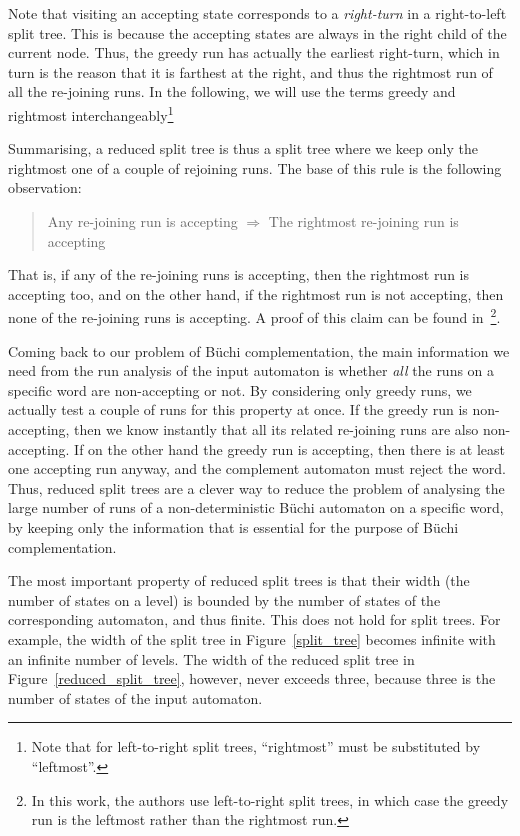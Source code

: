 Note that visiting an accepting state corresponds to a \textit{right-turn} in a right-to-left split tree. This is because the accepting states are always in the right child of the current node. Thus, the greedy run has actually the earliest right-turn, which in turn is the reason that it is farthest at the right, and thus the rightmost run of all the re-joining runs. In the following, we will use the terms greedy and rightmost interchangeably\footnote{Note that for left-to-right split trees, ``rightmost'' must be substituted by ``leftmost''.}

Summarising, a reduced split tree is thus a split tree where we keep only the rightmost one of a couple of rejoining runs. The base of this rule is the following observation:

\begin{quote}
Any re-joining run is accepting $\Longrightarrow$ The rightmost re-joining run is accepting
\end{quote}

That is, if any of the re-joining runs is accepting, then the rightmost run is accepting too, and on the other hand, if the rightmost run is not accepting, then none of the re-joining runs is accepting. A proof of this claim can be found in~\cite{vardi2007automata}\footnote{In this work, the authors use left-to-right split trees, in which case the greedy run is the leftmost rather than the rightmost run.}. 

Coming back to our problem of Büchi complementation, the main information we need from the run analysis of the input automaton is whether \textit{all} the runs on a specific word are non-accepting or not. By considering only greedy runs, we actually test a couple of runs for this property at once. If the greedy run is non-accepting, then we know  instantly that all its related re-joining runs are also non-accepting. If on the other hand the greedy run is accepting, then there is at least one accepting run anyway, and the complement automaton must reject the word. Thus, reduced split trees are a clever way to reduce the problem of analysing the large number of runs of a non-deterministic Büchi automaton on a specific word, by keeping only the information that is essential for the purpose of Büchi complementation.

The most important property of reduced split trees is that their width (the number of states on a level) is bounded by the number of states of the corresponding automaton, and thus finite. This does not hold for split trees. For example, the width of the split tree in Figure~\ref{split_tree} becomes infinite with an infinite number of levels. The width of the reduced split tree in Figure~\ref{reduced_split_tree}, however, never exceeds three, because three is the number of states of the input automaton.


